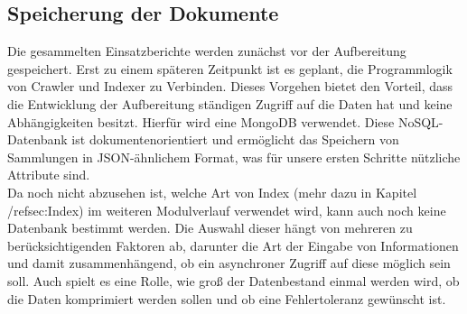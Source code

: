 \subsection{Speicherung der Dokumente}
\label{sec:Speicherung}
Die gesammelten Einsatzberichte werden zunächst vor der Aufbereitung gespeichert. Erst zu einem späteren Zeitpunkt ist es geplant, die Programmlogik von Crawler und Indexer zu Verbinden. Dieses Vorgehen bietet den Vorteil, dass die Entwicklung der Aufbereitung ständigen Zugriff auf die Daten hat und keine Abhängigkeiten besitzt. Hierfür wird eine MongoDB verwendet. Diese NoSQL-Datenbank ist dokumentenorientiert und ermöglicht das Speichern von Sammlungen in JSON-ähnlichem Format, was für unsere ersten Schritte nützliche Attribute sind.\\
Da noch nicht abzusehen ist, welche Art von Index (mehr dazu in Kapitel /ref{sec:Index}) im weiteren Modulverlauf verwendet wird, kann auch noch keine Datenbank bestimmt werden. Die Auswahl dieser hängt von mehreren zu berücksichtigenden Faktoren ab, darunter die Art der Eingabe von Informationen und damit zusammenhängend, ob ein asynchroner Zugriff auf diese möglich sein soll. Auch spielt es eine Rolle, wie groß der Datenbestand einmal werden wird, ob die Daten komprimiert werden sollen und ob eine Fehlertoleranz gewünscht ist.\\

